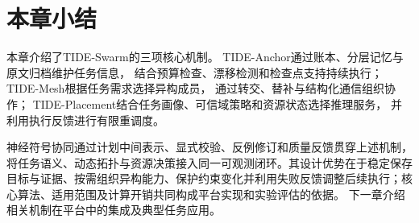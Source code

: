 \section{本章小结}

本章介绍了TIDE-Swarm的三项核心机制。
TIDE-Anchor通过账本、分层记忆与原文归档维护任务信息，
结合预算检查、漂移检测和检查点支持持续执行；
TIDE-Mesh根据任务需求选择异构成员，
通过转交、替补与结构化通信组织协作；
TIDE-Placement结合任务画像、可信域策略和资源状态选择推理服务，
并利用执行反馈进行有限重调度。

神经符号协同通过计划中间表示、显式校验、反例修订和质量反馈贯穿上述机制，将任务语义、动态拓扑与资源决策接入同一可观测闭环。其设计优势在于稳定保存目标与证据、按需组织异构能力、保护约束变化并利用失败反馈调整后续执行；核心算法、适用范围及计算开销共同构成平台实现和实验评估的依据。
下一章介绍相关机制在平台中的集成及典型任务应用。


